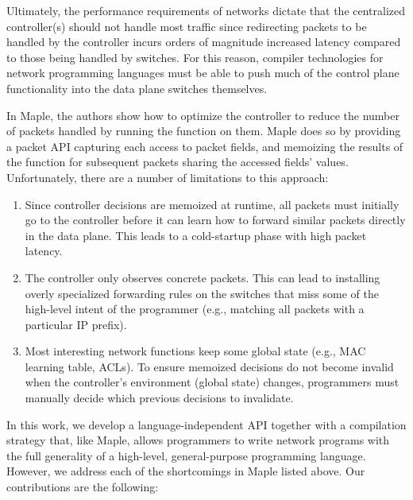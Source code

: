 \documentclass[nocopyrightspace]{sigplanconf}
\begin{document}
Ultimately, the performance requirements of networks dictate that the centralized controller(s) should not handle most traffic since redirecting packets to be handled by the controller incurs orders of magnitude increased latency compared to those being handled by switches. For this reason, compiler technologies for network programming languages must be able to push much of the control plane functionality into the data plane switches themselves. 

In Maple\cite{Maple}, the authors show how to optimize the controller to reduce the number of packets handled by running the function on them. Maple does so by providing a packet API capturing each access to packet fields, and memoizing the results of the function for subsequent packets sharing the accessed fields' values. Unfortunately, there are a number of limitations to this approach:


\begin{enumerate}
\item Since controller decisions are memoized at runtime, all packets must initially go to the controller before it can learn how to forward similar packets directly in the data plane. This leads to a cold-startup phase with high packet latency.
\item The controller only observes concrete packets. This can lead to installing overly specialized forwarding rules on the switches that miss some of the high-level intent of the programmer (e.g., matching all packets with a particular IP prefix).
\item Most interesting network functions keep some global state (e.g., MAC learning table, ACLs). To ensure memoized decisions do not become invalid when the controller's environment (global state) changes, programmers must manually decide which previous decisions to invalidate.
\end{enumerate}


In this work, we develop a language-independent API together with a compilation strategy that, like Maple, allows programmers to write network programs with the full generality of a high-level, general-purpose programming language.
However, we address each of the shortcomings in Maple listed above. Our contributions are the following:
\end{document}
